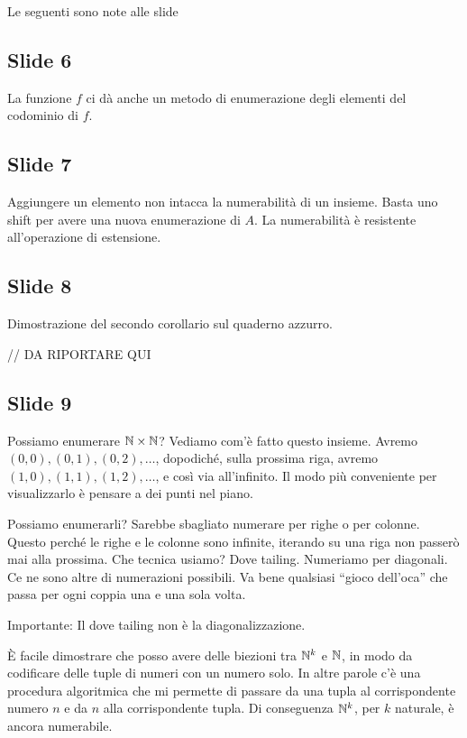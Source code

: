 Le seguenti sono note alle slide

\subsection{Slide 6}

La funzione $f$ ci dà anche un metodo di enumerazione degli elementi del codominio di $f$.

\subsection{Slide 7}

Aggiungere un elemento non intacca la numerabilità di un insieme. Basta uno shift per avere una
nuova enumerazione di $A$. La numerabilità è resistente all'operazione di estensione.

\subsection{Slide 8}

Dimostrazione del secondo corollario sul quaderno azzurro.

// DA RIPORTARE QUI

\subsection{Slide 9}

Possiamo enumerare $\mathbb{N} \times \mathbb{N}$? Vediamo com'è fatto questo insieme. Avremo $(0,0), (0,1),
(0,2),\dotsc$, dopodiché, sulla prossima riga, avremo $(1,0), (1,1), (1,2),\dotsc$, e così via
all'infinito. Il modo più conveniente per visualizzarlo è pensare a dei punti nel piano. 

Possiamo enumerarli? Sarebbe sbagliato numerare per righe o per colonne. Questo perché le righe e
le colonne sono infinite, iterando su una riga non passerò mai alla prossima. Che tecnica usiamo?
Dove tailing. Numeriamo per diagonali. Ce ne sono altre di numerazioni possibili. Va bene qualsiasi
``gioco dell'oca'' che passa per ogni coppia una e una sola volta.

Importante: Il dove tailing non è la diagonalizzazione.

È facile dimostrare che posso avere delle biezioni tra $\mathbb{N}^{k}$ e $\mathbb{N}$, in modo da codificare
delle tuple di numeri con un numero solo. In altre parole c'è una procedura algoritmica che mi
permette di passare da una tupla al corrispondente numero $n$ e da $n$ alla corrispondente tupla. Di
conseguenza $\mathbb{N}^{k}$, per $k$ naturale, è ancora numerabile.

